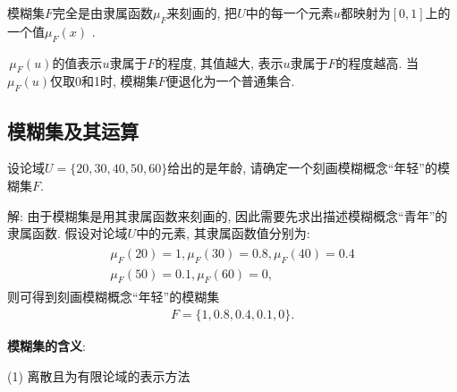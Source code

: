 \begin{remark}
 模糊集$F$完全是由隶属函数$\mu_{F}$来刻画的, 把$U$中的每一个元素$u$都映射为$[0, 1]$上的一个值$\mu_F(x)$ .

 \,$\mu_F(u)$的值表示$u$隶属于$F$的程度, 其值越大, 表示$u$隶属于$F$的程度越高. 当$\mu_F(u)$仅取0和1时, 模糊集$F$便退化为一个普通集合.
\end{remark}
\subsection{模糊集及其运算}
\begin{example}\label{AIC5Fuzzyexam551}
    设论域$U=\{20, 30, 40, 50, 60\}$给出的是年龄, 请确定一个刻画模糊概念“年轻”的模糊集$F$.
\end{example}

解: 由于模糊集是用其隶属函数来刻画的, 因此需要先求出描述模糊概念“青年”的隶属函数. 假设对论域$U$中的元素, 其隶属函数值分别为:
\begin{align}
    \begin{array}{l}
        {\mu_{F}(20)=1, \mu_{F}(30)=0.8, \mu_{F}(40)=0.4} \\ {\mu_{F}(50)=0.1, \mu_{F}(60)=0},
    \end{array}
\end{align}
则可得到刻画模糊概念“年轻”的模糊集
\begin{align}
    F=\{ 1, 0.8, 0.4, 0.1, 0\}.
\end{align}

\textbf{模糊集的含义}:

(1) 离散且为有限论域的表示方法

